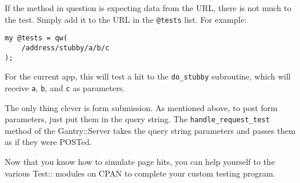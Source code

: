 If the method in question is expecting data from the URL, there is not
much to the test.  Simply add it to the URL in the \verb+@tests+ list.
For example:

\begin{verbatim}
my @tests = qw(
    /address/stubby/a/b/c
);
\end{verbatim}

For the current app, this will test a hit to the \verb+do_stubby+ subroutine,
which will receive \verb+a+, \verb+b+, and \verb+c+ as parameters.

%

The only thing clever is form submission.  As mentioned above, to post
form parameters, just put them in the query string.  The
\verb+handle_request_test+ method of the Gantry::Server takes the query
string parameters and passes them as if they were POSTed.

Now that you know how to simulate page hits, you can help yourself to the
various Test:: modules on CPAN to complete your custom testing program.
